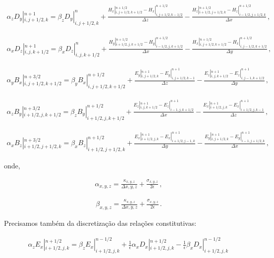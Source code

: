 \documentclass[a4paper,10pt]{article}
\begin{document}
\begin{align}
\alpha_z D_y|_{i,j+1/2,k}^{n+1} = \beta_z D_y|_{i,j+1/2,k}^{n} + \frac{H_x|_{i,j+1/2,k+1/2}^{n+1/2}-H_x|_{i,j+1/2,k-1/2}^{n+1/2}}{\Delta z}-\frac{H_z|_{i+1/2,j+1/2,k}^{n+1/2}-H_z|_{i-1/2,j+1/2,k}^{n+1/2}}{\Delta x}\,,
\end{align}

\begin{align}
\alpha_x D_z|_{i,j,k+1/2}^{n+1} = \beta_x D_z|_{i,j,k+1/2}^{n} + \frac{H_y|_{i+1/2,j,k+1/2}^{n+1/2}-H_y|_{i-1/2,j,k+1/2}^{n+1/2}}{\Delta x}-\frac{H_x|_{i,j+1/2,k+1/2}^{n+1/2}-H_x|_{i,j-1/2,k+1/2}^{n+1/2}}{\Delta y} \,,
\end{align}

\begin{align}
\alpha_y  B_x|_{i,j+1/2,k+1/2}^{n+3/2}= \beta_y B_x|_{i,j+1/2,k+1/2}^{n+1/2} + \frac{E_y|_{i,j+1/2,k}^{n+1}-E_y|_{i,j+1/2,k-1}^{n+1}}{\Delta z} - \frac{E_z|_{i,j,k+1/2}^{n+1}-E_z|_{i,j-1,k+1/2}^{n+1}}{\Delta y}\,,
\end{align}

\begin{align}
\alpha_z B_y|_{i+1/2,j,k+1/2}^{n+3/2} = \beta_z B_y|_{i+1/2,j,k+1/2}^{n+1/2} + \frac{E_z|_{i,j,k+1/2}^{n+1}-E_z|_{i-1,j,k+1/2}^{n+1}}{\Delta x}-\frac{E_x|_{i+1/2,j,k}^{n+1}-E_x|_{i+1/2,j,k-1}^{n+1}}{\Delta z}\,,
\end{align}

\begin{align}
\alpha_x B_z|_{i+1/2,j+1/2,k}^{n+3/2}= \beta_x B_z|_{i+1/2,j+1/2,k}^{n+1/2} + \frac{E_x|_{i+1/2,j,k}^{n+1}-E_x|_{i+1/2,j-1,k}^{n+1}}{\Delta y} - \frac{E_y|_{i,j+1/2,k}^{n+1}-E_y|_{i-1,j+1/2,k}^{n+1}}{\Delta x}\,,
\end{align}

onde, 

\begin{align}
\alpha_{x,y,z}=\frac{\kappa_{x,y,z}}{\Delta {x,y,z}}+\frac{\sigma_{x,y,z}}{2 \epsilon}\,, 
\end{align}

\begin{align}
\beta_{x,y,z}=\frac{\kappa_{x,y,z}}{\Delta {x,y,z}}+\frac{\sigma_{x,y,z}}{2 \epsilon}\,.
\end{align}

Precisamos também da discretização das relações constitutivas:

\begin{align}
\alpha_z E_x |_{i+1/2,j,k}^{n+1/2} =
\beta_z E_x |_{i+1/2,j,k}^{n-1/2}  +
\frac{1}{\epsilon} \alpha_x  D_x |_{i+1/2,j,k}^{n+1/2}  -
\frac{1}{\epsilon} \beta_x  D_x |_{i+1/2,j,k}^{n-1/2}\,
\end{align}
\end{document}
